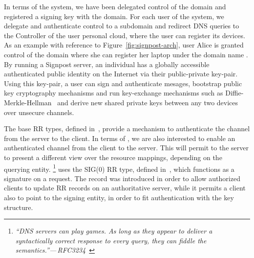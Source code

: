 In terms of the \signpost system, we have been delegated control of the \fqsn{ }
domain and registered a signing key with the  domain.  For each user
of the \signpost system, we delegate and authenticate control to a subdomain and
redirect DNS queries to the \signpost Controller of the user personal cloud,
where the user can register its devices. As an example with reference to
Figure~\ref{fig:signpost-arch}, user Alice is granted control of the domain
 where she can register her laptop under the domain name
.  By running a Signpost server, an individual has a globally
accessible authenticated public identity on the Internet via their
public-private key-pair. Using this key-pair, a user can sign and authenticate
mesages, bootstrap public key cryptography mechanisms and run key-exchange
mechanisms such as Diffie-Merkle-Hellman~\cite{diffie,RFC2631} and derive new
shared private keys between any two devices over unsecure channels.

The base \dnssec RR types, defined in~\cite{RFC4034}, provide a mechanism to
authenticate the channel from the server to the client. In terms of \signpost,
we are also interested to enable an authenticated channel from the client to the
server. This will permit to the server to present a different view over the
resource mappings, depending on the querying entity.  \footnote{{\em ``DNS
    servers can play games. As long as they appear to deliver a syntactically
    correct response to every query, they can fiddle the
    semantics.''---\,RFC3234~\cite{RFC3234}}} \signpost uses the SIG(0) RR type,
defined in~\cite{RFC2931}, which functions as a signature on a request. The
record was introduced in order to allow authorized clients to update RR records
on an authoritative server, while it permits a client also to point to the
signing entity, in order to fit authentication with the \dnssec key structure. 


